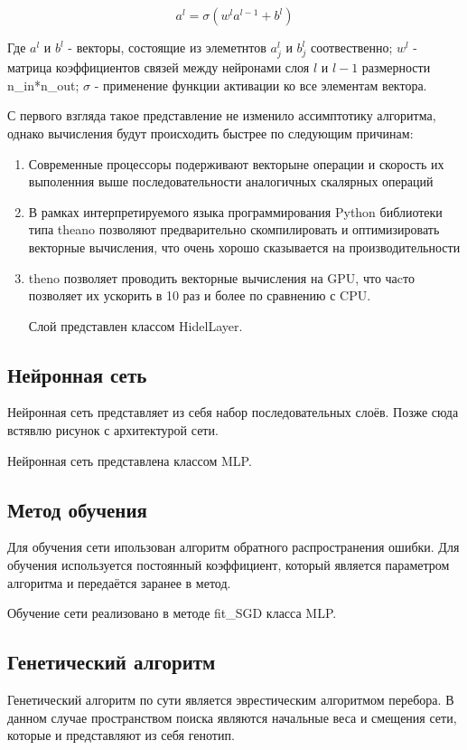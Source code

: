 \documentclass[a4paper,12pt]{article}
\begin{document}
{\large $$a^{l} = \sigma\left( w^{l} a^{l-1} + b^l \right)$$}

Где $a^{l}$ и $b^{l}$ - векторы, состоящие из элеметнтов $a^{l}_j$ и $b^l_j$ соотвественно; $w^l$ - матрица коэффициентов связей между нейронами слоя $l$ и $l-1$ размерности n\_in*n\_out; $\sigma$ - применение функции активации ко все элементам вектора.

С первого взгляда такое представление не изменило ассимптотику алгоритма, однако вычисления будут происходить быстрее по следующим причинам:
\begin{enumerate}
\item Современные процессоры подерживают векторыне операции и скорость их выполенния выше последовательности аналогичных скалярных операций
\item В рамках интерпретируемого языка программирования Python библиотеки типа theano позволяют предварительно скомпилировать и оптимизировать векторные вычисления, что очень хорошо сказывается на производительности
\item theno позволяет проводить векторные вычисления на GPU, что чаcто позволяет их ускорить в 10 раз и более по сравнению с CPU.

Слой представлен классом HidelLayer.
\end{enumerate}

\subsection{Нейронная сеть}
Нейронная сеть представляет из себя набор последовательных слоёв. Позже сюда встявлю рисунок с архитектурой сети.

Нейронная сеть представлена классом MLP.
\subsection{Метод обучения}
Для обучения сети ипользован алгоритм обратного распространения ошибки.
Для обучения используется постоянный коэффициент, который является параметром алгоритма и передаётся заранее в метод.

Обучение сети реализовано в методе fit\_SGD класса MLP.
\subsection{Генетический алгоритм}
Генетический алгоритм по сути является эврестическим алгоритмом перебора. В данном случае пространством поиска являются начальные веса и смещения сети, которые и представляют из себя генотип.
\end{document}

